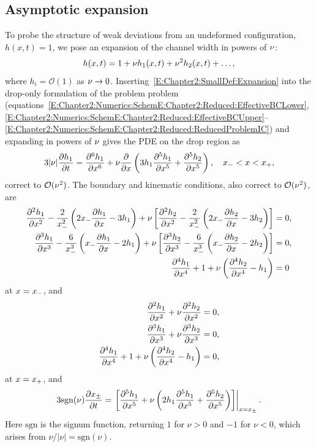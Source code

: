 \subsection{Asymptotic expansion}
To probe the structure of  weak deviations from an undeformed configuration, $h(x,t) = 1$, we pose an expansion of the channel width in powers of $\nu$:
\begin{equation}\label{E:Chapter2:SmallDef:Expansion}
h(x,t) = 1 + \nu h_1(x,t) + \nu^2 h_2(x,t) + \dots,
\end{equation}
where $h_i = \mathcal{O}(1)$ as $\nu \to 0$.  Inserting~\eqref{E:Chapter2:SmallDef:Expansion} into the drop-only formulation of the problem problem (equations~\eqref{E:Chapter2:Numerics:SchemE:Chapter2:Reduced:EffectiveBCLower},~\eqref{E:Chapter2:Numerics:SchemE:Chapter2:Reduced:EffectiveBCUpper}--\eqref{E:Chapter2:Numerics:SchemE:Chapter2:Reduced:ReducedProblemIC}) and expanding in powers of $\nu$ gives the PDE on the drop region as
\begin{equation}\label{E:Chapter2:SmallDef:PDE}
3|\nu|\frac{\partial h_1}{\partial t} =  \frac{\partial ^6 h_1}{\partial x^6} + \nu \frac{\partial }{\partial x}\left(3h_1 \frac{\partial ^5 h_1}{\partial x^5} + \frac{\partial ^5 h_2}{\partial x^5}\right),  \quad x_{-} < x < x_{+},
\end{equation}
correct to $\mathcal{O}(\nu^2)$. The boundary and kinematic conditions, also correct to $\mathcal{O}(\nu^2)$, are
\begin{align}
\frac{\partial ^2 h_1}{\partial x^2} - \frac{2}{x_{-}^2}\left(2x_{-} \frac{\partial h_1}{\partial x} - 3h_1\right) + \nu\left[ \frac{\partial ^2 h_2}{\partial x^2} - \frac{2}{x_{-}^2}\left(2x_{-} \frac{\partial h_2}{\partial x} - 3h_2\right) \right] &= 0,\label{E:Chapter2:SmallDef:BC1}\\
\frac{\partial ^3 h_1}{\partial x^3} - \frac{6}{x_{-}^3}\left(x_{-} \frac{\partial h_1}{\partial x} - 2h_1\right) + \nu\left[ \frac{\partial ^3 h_2}{\partial x^3} - \frac{6}{x_{-}^3}\left(x_{-} \frac{\partial h_2}{\partial x} - 2h_2\right) \right] &= 0,\label{E:Chapter2:SmallDef:BC2}\\
\frac{\partial ^4 h_1}{\partial x^4} + 1 + \nu \left(\frac{\partial ^4 h_2}{\partial x^4} - h_1\right) &=0\label{E:Chapter2:SmallDef:BC3}
\end{align}
at $x = x_{-}$,  and
\begin{align}
\frac{\partial ^2 h_1}{\partial x^2} + \nu \frac{\partial ^2 h_2}{\partial x^2} &=0,\label{E:Chapter2:SmallDef:BC4}\\
\frac{\partial ^3 h_1}{\partial x^3} + \nu \frac{\partial ^3 h_2}{\partial x^3} &=0,\label{E:Chapter2:SmallDef:BC5}\\
\frac{\partial ^4 h_1}{\partial x^4} + 1 + \nu \left(\frac{\partial ^4 h_2}{\partial x^4} - h_1\right)&=0,\label{E:Chapter2:SmallDef:BC6}
\end{align}
at $x = x_{+}$, and
\begin{equation}\label{E:Chapter2:SmallDef:Kinematic}
3\mathrm{sgn}(\nu) \frac{\partial x_{\pm}}{\partial t} =\left. \left[  \frac{\partial ^5 h_1}{\partial x^5}  + \nu \left(2 h_1 \frac{\partial ^5 h_1}{\partial x^5} +\frac{\partial ^5 h_2}{\partial x^5}\right)\right]\right|_{x = x_{\pm}}.
\end{equation}
Here $\mathrm{sgn}$ is the signum function, returning $1$ for $\nu > 0$ and $-1$ for $\nu < 0$, which arises from $\nu/|\nu| = \mathrm{sgn}(\nu)$.
